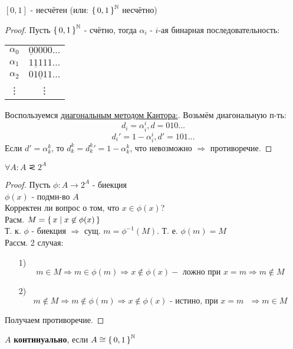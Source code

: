 \begin{theorem} [Кантора]
$[0, 1]$ - несчётен (или: $\set{0, 1}^{\mathbb{N}}$ несчётно)
\end{theorem}
\begin{proof}
Пусть $\set{0, 1}^{\mathbb{N}}$ - счётно, тогда $\alpha_i$ - $i$-ая бинарная последовательность:
\begin{center}
\begin{tabular}{ |c|c| } 
 \hline
 $\alpha_0$ & $\underline{0}0000\ldots$ \\
 $\alpha_1$ & $1\underline{1}111\ldots$ \\
 $\alpha_2$ & $01\underline{0}11\ldots$ \\
 \vdots & \vdots \\
 \hline
\end{tabular}
\end{center}
Воспользуемся \underline{диагональным методом Кантора:}. Возьмём диагональную п-ть:
\[
d_i = \alpha_i^{i}, d = 010\ldots
\]
\[
d_{i}' = 1 - \alpha_i^{i}, d' = 101\ldots
\]
Если $d' = \alpha_{k}^{k}$, то $d_{k}^{k} = d_{k}^{k}' = 1 - \alpha_{k}^{k}$, что невозможно $\Rightarrow$ противоречие.
\end{proof}
\begin{theorem}
$\forall A \colon A \simless 2^{A}$
\end{theorem}
\begin{proof}
Пусть $\phi: A \rightarrow 2^{A}$ - биекция \\
$\phi(x)$ - подмн-во $A$ \\
Корректен ли вопрос о том, что $x \in \phi(x)$? \\
Расм. $M = \set{x | x \not\in \phi(x)}$ \\
Т. к. $\phi$ - биекция $\Rightarrow$ сущ. $m = \phi^{-1}(M)$. Т. е. $\phi(m) = M$ \\
Рассм. 2 случая:
\begin{itemize}
  \item [1) ] \[
  m \in M \Rightarrow m \in \phi(m) \Rightarrow x \not\in \phi(x) - \text{ ложно при $x = m \Rightarrow$} m \not\in M
  \]
\item [2) ]\[
  m \not\in M \Rightarrow m \not\in \phi(m) \Rightarrow x \not\in \phi(x) \text{ - истино, при $x = m$ $\Rightarrow$} m \in M
\]
\end{itemize}
Получаем противоречие.
\end{proof}
\begin{definition}
$A$ \textbf{континуально}, если $A \cong \set{0, 1}^{\mathbb{N}}$
\end{definition}
